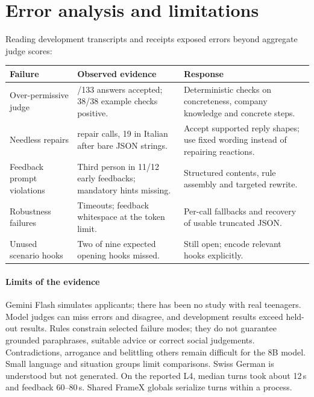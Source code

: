 \documentclass[10pt,a4paper]{article}
\begin{document}
\section{Error analysis and limitations}
Reading development transcripts and receipts exposed errors beyond aggregate judge scores:
\begin{center}\small
\begin{tabularx}{\textwidth}{@{}>{\raggedright\arraybackslash}p{3.2cm}>{\raggedright\arraybackslash}X>{\raggedright\arraybackslash}p{4.5cm}@{}}
\toprule
\sffamily\bfseries Failure & \sffamily\bfseries Observed evidence & \sffamily\bfseries Response \\
\midrule
Over-permissive judge & 130/133 answers accepted; 38/38 example checks positive. & Deterministic checks on concreteness, company knowledge and concrete steps. \\
Needless repairs & 23 repair calls, 19 in Italian after bare JSON strings. & Accept supported reply shapes; use fixed wording instead of repairing reactions. \\
Feedback prompt violations & Third person in 11/12 early feedbacks; mandatory hints missing. & Structured contents, rule assembly and targeted rewrite. \\
Robustness failures & Timeouts; feedback whitespace at the token limit. & Per-call fallbacks and recovery of usable truncated JSON. \\
Unused scenario hooks & Two of nine expected opening hooks missed. & Still open; encode relevant hooks explicitly. \\
\bottomrule
\end{tabularx}
\end{center}

\paragraph{Limits of the evidence}
Gemini Flash simulates applicants; there has been no study with real teenagers. Model judges can miss
errors and disagree, and development results exceed held-out results. Rules constrain selected failure
modes; they do not guarantee grounded paraphrases, suitable advice or correct social judgements.
Contradictions, arrogance and belittling others remain difficult for the 8B model. Small language and
situation groups limit comparisons. Swiss German is understood but not generated. On the reported L4,
median turns took about 12\,s and feedback 60--80\,s. Shared FrameX globals serialize turns within a process.
\end{document}
